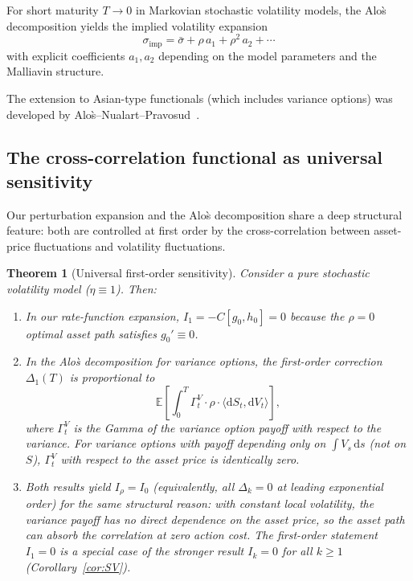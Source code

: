 \documentclass[11pt]{article}
\newtheorem{theorem}{Theorem}
\theoremstyle{definition}
\newcommand{\dd}{\mathrm{d}}
\newcommand{\E}{\mathbb{E}}
\begin{document}
For short maturity $T \to 0$ in Markovian stochastic volatility models, the Alo\`s decomposition yields the implied volatility expansion
\begin{equation}
  \sigma_{\mathrm{imp}} = \bar{\sigma} + \rho\,a_1 + \rho^2\,a_2 + \cdots
\end{equation}
with explicit coefficients $a_1, a_2$ depending on the model parameters and the Malliavin structure.

The extension to Asian-type functionals (which includes variance options) was developed by Alo\`s--Nualart--Pravosud~\cite{Alos2024}.

\subsection{The cross-correlation functional as universal sensitivity}\label{sec:universal_C}

Our perturbation expansion and the Alo\`s decomposition share a deep structural feature: both are controlled at first order by the cross-correlation between asset-price fluctuations and volatility fluctuations.

\begin{theorem}[Universal first-order sensitivity]\label{thm:alos_connection}
Consider a pure stochastic volatility model ($\eta \equiv 1$). Then:
\begin{enumerate}[label=(\roman*)]
  \item In our rate-function expansion, $I_1 = -C[g_0, h_0] = 0$ because the $\rho=0$ optimal asset path satisfies $g_0' \equiv 0$.

  \item In the Alo\`s decomposition for variance options, the first-order correction $\Delta_1(T)$ is proportional to
  \begin{equation}
    \E\!\left[\int_0^T \Gamma_t^V \cdot \rho\cdot \langle \dd S_t, \dd V_t\rangle\right],
  \end{equation}
  where $\Gamma_t^V$ is the Gamma of the variance option payoff with respect to the variance. For variance options with payoff depending only on $\int V_s\,\dd s$ (not on $S$), $\Gamma_t^V$ with respect to the asset price is identically zero.

  \item Both results yield $I_\rho = I_0$ (equivalently, all $\Delta_k = 0$ at leading exponential order) for the same structural reason: with constant local volatility, the variance payoff has no direct dependence on the asset price, so the asset path can absorb the correlation at zero action cost. The first-order statement $I_1 = 0$ is a special case of the stronger result $I_k = 0$ for all $k \geq 1$ (Corollary~\ref{cor:SV}).
\end{enumerate}
\end{theorem}
\end{document}
